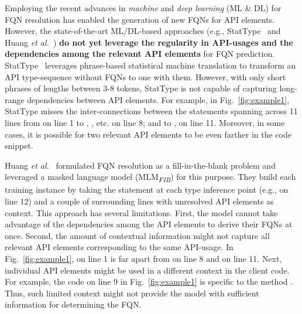 Employing the recent advances in {\em machine} and {\em deep learning} (ML \& DL) for FQN resolution has enabled the generation of new FQNs for API elements. However, the state-of-the-art ML/DL-based approaches (e.g., StatType~\cite{icse18} and Huang {\em et al.}~\cite{prompt-ase22}) {\bf do not yet leverage the regularity in API-usages and the dependencies among the relevant API elements} for FQN prediction. StatType~\cite{icse18} leverages phrase-based statistical machine translation to transform an API type-sequence without FQNs to one with them. However, with only short phrases of lengths between 3-8 tokens, StatType is not capable of capturing long-range dependencies between API elements. For example, in Fig.~\ref{fig:example1}, StatType misses the inter-connections between the statements spanning across 11 lines from  on line 1 to , , etc. on line 8; and to ,  on line 11. Moreover, in some cases, it is possible for two relevant API elements to be even farther in the code snippet.

Huang {\em et al.}~\cite{prompt-ase22} formulated FQN resolution as a
fill-in-the-blank problem and leveraged a masked language model
(MLM\textsubscript{\textit{FIB}}) for this purpose. They build each
training instance by taking the statement at each type inference point
(e.g.,  on line 12) and a couple of surrounding lines with
unresolved API elements as context. This approach has several
limitations. First, the model cannot take advantage of the
dependencies among the API elements to derive their FQNs at once.
Second, the amount of contextual information might not capture all
relevant API elements corresponding to the same API-usage. In
Fig.~\ref{fig:example1},  on line 1 is far apart from
 on line 8 and  on line 11. Next,
individual API elements might be used in a different context in the
client code. For example, the code on line 9 in
Fig.~\ref{fig:example1} is specific to the method
. Thus, such limited context might not provide the
model with sufficient information for determining the FQN.


